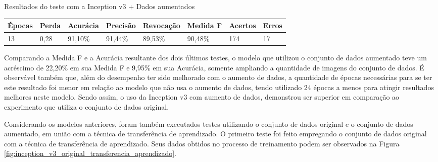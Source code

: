 \documentclass[
	12pt,				%
	oneside,			%
	a4paper,			%
	english,			%
	brazil				%
	]{abntex2ppgsi}
\begin{document}
\begin{quadro}[H]
\caption{Resultados do teste com a Inception v3 + Dados aumentados}
\label{quad:resultados_teste_inception_v3_com_dados_aumentados}
\centering
\begin{tabular}{|l|l|l|l|l|l|l|l|}
\cline{1-8}
Épocas & Perda & Acurácia & Precisão & Revocação & Medida F & Acertos & Erros \\ \hline
13 & 0,28 & 91,10\% & 91,44\% & 89,53\% & 90,48\% & 174 & 17 \\
\cline{1-8}
\end{tabular}
\end{quadro}

Comparando a Medida F e a Acurácia resultante dos dois últimos testes, o modelo que utilizou o conjunto de dados aumentado teve um acréscimo de 22,20\% em sua Medida F e 9,95\% em sua Acurácia, somente ampliando a quantidade de imagens do conjunto de dados. É observável também que, além do desempenho ter sido melhorado com o aumento de dados, a quantidade de épocas necessárias para se ter este resultado foi menor em relação ao modelo que não usa o aumento de dados, tendo utilizado 24 épocas a menos para atingir resultados melhores neste modelo. Sendo assim, o uso da Inception v3 com aumento de dados, demonstrou ser superior em comparação ao experimento que utiliza o conjunto de dados original.

Considerando os modelos anteriores, foram também executados testes utilizando o conjunto de dados original e o conjunto de dados aumentado, em união com a técnica de transferência de aprendizado. O primeiro teste foi feito empregando o conjunto de dados original com a técnica de transferência de aprendizado. Seus dados obtidos no processo de treinamento podem ser observados na Figura \ref{fig:inception_v3_original_transferencia_aprendizado}.
\end{document}

